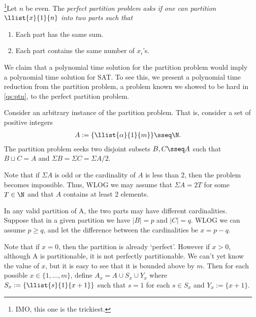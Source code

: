 \documentclass{article}
\begin{document}

\begin{subexercise}
  \footnote[3]{IMO, this one is the trickiest.}Let \( n \) be even.
  The \it{perfect partition problem} asks if one can partition \( \llist{x}{1}{n} \) into two parts such that
  \begin{enumerate}[label=(\alph*)]
    \item Each part has the same sum.
    \item Each part contains the same number of \( x_i \)'s.
  \end{enumerate}
\end{subexercise}
\begin{solution}
  We claim that a polynomial time solution for the partition problem would imply a polynomial time solution for SAT.
  To see this, we present a polynomial time reduction from the partition problem, a problem known we showed to be hard in \ref{qs:ptn}, to the perfect partition problem.

  Consider an arbitrary instance of the partition problem.
  That is, consider a set of positive integers \begin{align*}
    A := \{\llist{\alpha}{1}{m}\} \sseq \N.
  \end{align*}
  The partition problem seeks two disjoint subsets \( B,C\sseq A \) such that \( B\sqcup C = A \) and \( \Sigma B = \Sigma C = \Sigma A / 2 \).

  Note that if \( \Sigma A \) is odd or the cardinality of \( A \) is less than 2, then the problem becomes impossible.
  Thus, WLOG we may assume that \( \Sigma A = 2T \) for some \( T\in \N \) and that \( A \) contains at least 2 elements.

  In any valid partition of A, the two parts may have different cardinalities.
  Suppose that in a given partition we have \( |B| = p \) and \( |C| = q \).
  WLOG we can assume \( p \geq q \), and let the difference between the cardinalities be \( x = p-q \).

  Note that if \( x = 0 \), then the partition is already `perfect'.
  However if \( x > 0 \), although A is partitionable, it is not perfectly partitionable.
  We can't yet know the value of \( x \), but it is easy to see that it is bounded above by \( m \).
  Then for each possible \( x\in \{1,\ldots,m\} \), define \( A_x = A \cup S_x \cup Y_x \) where \( S_x := \{\llist{s}{1}{x+1} \} \) such that \( s = 1 \) for each \( s\in S_x \) and \( Y_x := \{x+1\} \).


\end{solution}
\end{document}
